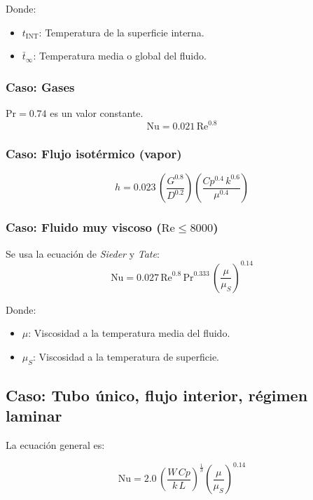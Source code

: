 Donde:
\begin{itemize}
    \item $t_\text{INT}$: Temperatura de la superficie interna.
    \item $\bar{t}_\infty$: Temperatura media o global del fluido.
\end{itemize}

\subsubsection{Caso: Gases}
$\text{Pr} = 0.74$ es un valor constante.
\begin{equation}
    \text{Nu} = 0.021\,\text{Re}^{0.8}
\end{equation}

\subsubsection{Caso: Flujo isotérmico (vapor)}
\begin{equation}
    h = 0.023\,
    \left(\frac{G^{0.8}}{D^{0.2}}\right)
    \left(\frac{Cp^{0.4}\,k^{0.6}}{\mu^{0.4}}\right)
\end{equation}

\subsubsection{Caso: Fluido muy viscoso ($\text{Re} \le 8000$)}
Se usa la ecuación de \emph{Sieder} y \emph{Tate}:
\begin{equation}
    \text{Nu} = 0.027\,\text{Re}^{0.8}\,\text{Pr}^{0.333}\,
    \left(\frac{\mu}{\mu_S}\right)^{0.14}
\end{equation}

Donde:
\begin{itemize}
    \item $\mu$: Viscosidad a la temperatura media del fluido.
    \item $\mu_S$: Viscosidad a la temperatura de superficie.
\end{itemize}

\subsection{Caso: Tubo único, flujo interior, régimen laminar}
La ecuación general es:

\begin{equation}
    \text{Nu} = 2.0\,
    \left(\frac{W\,Cp}{k\,L}\right)^{\frac{1}{3}}
    \left(\frac{\mu}{\mu_S}\right)^{0.14}
\end{equation}


